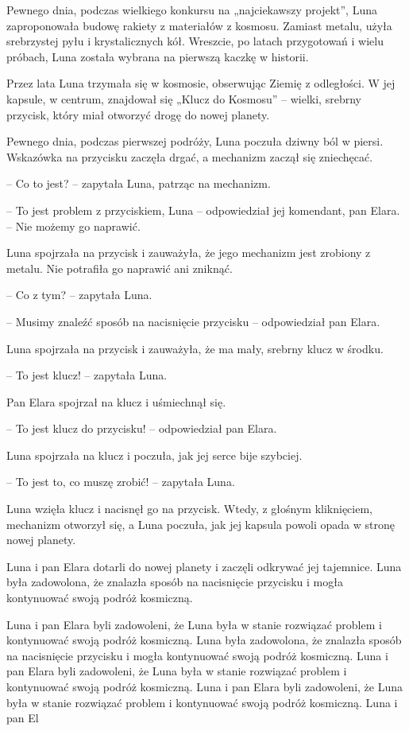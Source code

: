 \documentclass[10pt]{article}
\begin{document}
{\begin{minipage}{\textwidth}
Pewnego dnia, podczas wielkiego konkursu na „najciekawszy projekt”, Luna zaproponowała budowę rakiety z materiałów z kosmosu. Zamiast metalu, użyła srebrzystej pyłu i krystalicznych kół. Wreszcie, po latach przygotowań i wielu próbach, Luna została wybrana na pierwszą kaczkę w historii.
\par\smallskip
Przez lata Luna trzymała się w kosmosie, obserwując Ziemię z odległości. W jej kapsule, w centrum, znajdował się „Klucz do Kosmosu” – wielki, srebrny przycisk, który miał otworzyć drogę do nowej planety.
\par\smallskip
Pewnego dnia, podczas pierwszej podróży, Luna poczuła dziwny ból w piersi. Wskazówka na przycisku zaczęła drgać, a mechanizm zaczął się zniechęcać.
\par\smallskip
– Co to jest? – zapytała Luna, patrząc na mechanizm.
\par\smallskip
– To jest problem z przyciskiem, Luna – odpowiedział jej komendant, pan Elara. – Nie możemy go naprawić.
\par\smallskip
Luna spojrzała na przycisk i zauważyła, że jego mechanizm jest zrobiony z metalu. Nie potrafiła go naprawić ani zniknąć.
\par\smallskip
– Co z tym? – zapytała Luna.
\par\smallskip
– Musimy znaleźć sposób na nacisnięcie przycisku – odpowiedział pan Elara.
\par\smallskip
Luna spojrzała na przycisk i zauważyła, że ma mały, srebrny klucz w środku.
\par\smallskip
– To jest klucz! – zapytała Luna.
\par\smallskip
Pan Elara spojrzał na klucz i uśmiechnął się.
\par\smallskip
– To jest klucz do przycisku! – odpowiedział pan Elara.
\par\smallskip
Luna spojrzała na klucz i poczuła, jak jej serce bije szybciej.
\par\smallskip
– To jest to, co muszę zrobić! – zapytała Luna.
\par\smallskip
Luna wzięła klucz i nacisnęł go na przycisk. Wtedy, z głośnym kliknięciem, mechanizm otworzył się, a Luna poczuła, jak jej kapsula powoli opada w stronę nowej planety.
\par\smallskip
Luna i pan Elara dotarli do nowej planety i zaczęli odkrywać jej tajemnice. Luna była zadowolona, że znalazła sposób na nacisnięcie przycisku i mogła kontynuować swoją podróż kosmiczną.
\par\smallskip
Luna i pan Elara byli zadowoleni, że Luna była w stanie rozwiązać problem i kontynuować swoją podróż kosmiczną. Luna była zadowolona, że znalazła sposób na nacisnięcie przycisku i mogła kontynuować swoją podróż kosmiczną. Luna i pan Elara byli zadowoleni, że Luna była w stanie rozwiązać problem i kontynuować swoją podróż kosmiczną. Luna i pan Elara byli zadowoleni, że Luna była w stanie rozwiązać problem i kontynuować swoją podróż kosmiczną. Luna i pan El\par\smallskip

\end{minipage}}
\end{document}
